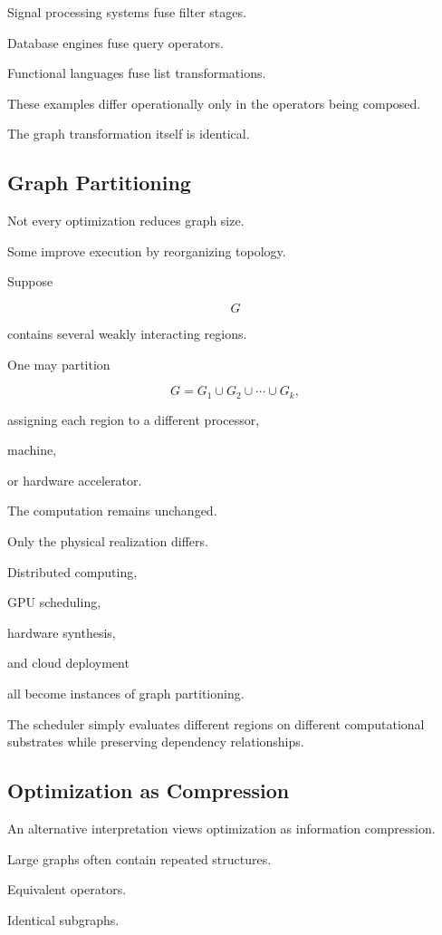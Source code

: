 \documentclass[12pt,oneside]{article}
\begin{document}
Signal processing systems fuse filter stages.

Database engines fuse query operators.

Functional languages fuse list transformations.

These examples differ operationally only in the operators being composed.

The graph transformation itself is identical.

\subsection{Graph Partitioning}

Not every optimization reduces graph size.

Some improve execution by reorganizing topology.

Suppose

\[
G
\]

contains several weakly interacting regions.

One may partition

\[
G
=
G_1
\cup
G_2
\cup
\cdots
\cup
G_k,
\]

assigning each region to a different processor,

machine,

or hardware accelerator.

The computation remains unchanged.

Only the physical realization differs.

Distributed computing,

GPU scheduling,

hardware synthesis,

and cloud deployment

all become instances of graph partitioning.

The scheduler simply evaluates different regions on different computational substrates while preserving dependency relationships.

\subsection{Optimization as Compression}

An alternative interpretation views optimization as information compression.

Large graphs often contain repeated structures.

Equivalent operators.

Identical subgraphs.
\end{document}

